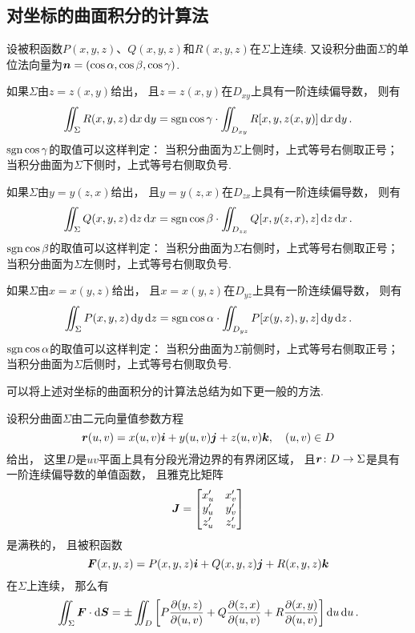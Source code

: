 \subsection{对坐标的曲面积分的计算法}
\begin{theorem}
设被积函数\(P(x,y,z)\)、\(Q(x,y,z)\)和\(R(x,y,z)\)在\(\Sigma\)上连续.
又设积分曲面\(\Sigma\)的单位法向量为\(\boldsymbol{n} = (\cos\alpha,\cos\beta,\cos\gamma)\).

如果\(\Sigma\)由\(z=z(x,y)\)给出，
且\(z=z(x,y)\)在\(D_{xy}\)上具有一阶连续偏导数，
则有\begin{equation}\label{equation:线积分与面积分.第二类曲面积分的计算式1}
	\iint_\Sigma R(x,y,z) \dd{x}\dd{y}
	= \operatorname{sgn}\cos\gamma \cdot \iint_{D_{xy}} R[x,y,z(x,y)] \dd{x}\dd{y}.
\end{equation}
\(\operatorname{sgn}\cos\gamma\)的取值可以这样判定：
当积分曲面为\(\Sigma\)上侧时，上式等号右侧取正号；
当积分曲面为\(\Sigma\)下侧时，上式等号右侧取负号.

如果\(\Sigma\)由\(y=y(z,x)\)给出，
且\(y=y(z,x)\)在\(D_{zx}\)上具有一阶连续偏导数，
则有\begin{equation}\label{equation:线积分与面积分.第二类曲面积分的计算式2}
	\iint_\Sigma Q(x,y,z) \dd{z}\dd{x}
	= \operatorname{sgn}\cos\beta \cdot \iint_{D_{zx}} Q[x,y(z,x),z] \dd{z}\dd{x}.
\end{equation}
\(\operatorname{sgn}\cos\beta\)的取值可以这样判定：
当积分曲面为\(\Sigma\)右侧时，上式等号右侧取正号；
当积分曲面为\(\Sigma\)左侧时，上式等号右侧取负号.

如果\(\Sigma\)由\(x=x(y,z)\)给出，
且\(x=x(y,z)\)在\(D_{yz}\)上具有一阶连续偏导数，
则有\begin{equation}\label{equation:线积分与面积分.第二类曲面积分的计算式3}
	\iint_\Sigma P(x,y,z) \dd{y}\dd{z}
	= \operatorname{sgn}\cos\alpha \cdot \iint_{D_{yz}} P[x(y,z),y,z] \dd{y}\dd{z}.
\end{equation}
\(\operatorname{sgn}\cos\alpha\)的取值可以这样判定：
当积分曲面为\(\Sigma\)前侧时，上式等号右侧取正号；
当积分曲面为\(\Sigma\)后侧时，上式等号右侧取负号.
\end{theorem}

可以将上述对坐标的曲面积分的计算法总结为如下更一般的方法.
\begin{theorem}
设积分曲面\(\Sigma\)由二元向量值参数方程\[
	\boldsymbol{r}(u,v) = x(u,v) \boldsymbol{i} + y(u,v) \boldsymbol{j} + z(u,v) \boldsymbol{k},
	\quad (u,v) \in D
\]给出，
这里\(D\)是\(uv\)平面上具有分段光滑边界的有界闭区域，
且\(\boldsymbol{r}\colon D \to \Sigma\)是具有一阶连续偏导数的单值函数，
且雅克比矩阵\[
	\boldsymbol{J} = \begin{bmatrix}
		x'_u & x'_v \\
		y'_u & y'_v \\
		z'_u & z'_v
	\end{bmatrix}
\]是满秩的，
且被积函数\[
	\boldsymbol{F}(x,y,z) = P(x,y,z) \boldsymbol{i} + Q(x,y,z) \boldsymbol{j} + R(x,y,z) \boldsymbol{k}
\]在\(\Sigma\)上连续，
那么有\[
	\iint_\Sigma \boldsymbol{F} \cdot \dd{\boldsymbol{S}}
	= \pm \iint_D \left[
		P \pdv{ (y,z) }{ (u,v) }
		+ Q \pdv{ (z,x) }{ (u,v) }
		+ R \pdv{ (x,y) }{ (u,v) }
	\right] \dd{u}\dd{u}.
\]
\end{theorem}

